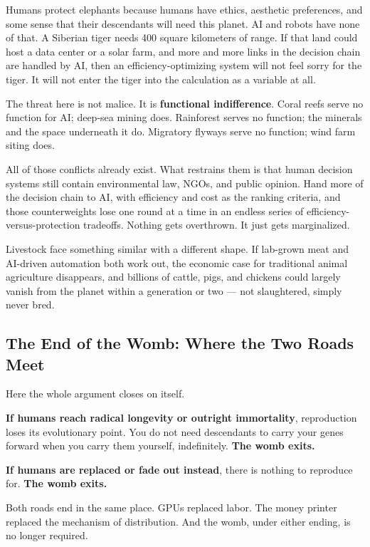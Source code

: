 \documentclass[11pt,a4paper]{article}
\begin{document}
Humans protect elephants because humans have ethics, aesthetic preferences, and some sense that their descendants will need this planet. AI and robots have none of that. A Siberian tiger needs 400 square kilometers of range. If that land could host a data center or a solar farm, and more and more links in the decision chain are handled by AI, then an efficiency-optimizing system will not feel sorry for the tiger. It will not enter the tiger into the calculation as a variable at all.

The threat here is not malice. It is \textbf{functional indifference}. Coral reefs serve no function for AI; deep-sea mining does. Rainforest serves no function; the minerals and the space underneath it do. Migratory flyways serve no function; wind farm siting does.

All of those conflicts already exist. What restrains them is that human decision systems still contain environmental law, NGOs, and public opinion. Hand more of the decision chain to AI, with efficiency and cost as the ranking criteria, and those counterweights lose one round at a time in an endless series of efficiency-versus-protection tradeoffs. Nothing gets overthrown. It just gets marginalized.

Livestock face something similar with a different shape. If lab-grown meat and AI-driven automation both work out, the economic case for traditional animal agriculture disappears, and billions of cattle, pigs, and chickens could largely vanish from the planet within a generation or two --- not slaughtered, simply never bred.

\subsection{The End of the Womb: Where the Two Roads Meet}

Here the whole argument closes on itself.

\textbf{If humans reach radical longevity or outright immortality}, reproduction loses its evolutionary point. You do not need descendants to carry your genes forward when you carry them yourself, indefinitely. \textbf{The womb exits.}

\textbf{If humans are replaced or fade out instead}, there is nothing to reproduce for. \textbf{The womb exits.}

Both roads end in the same place. GPUs replaced labor. The money printer replaced the mechanism of distribution. And the womb, under either ending, is no longer required.
\end{document}

